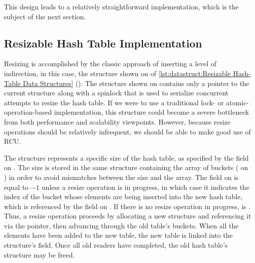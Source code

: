 This design leads to a relatively straightforward implementation,
which is the subject of the next section.

\subsection{Resizable Hash Table Implementation}
\label{sec:datastruct:Resizable Hash Table Implementation}

\begin{fcvref}
Resizing is accomplished by the classic approach of inserting a level
of indirection, in this case, the  structure shown on
 of
\cref{lst:datastruct:Resizable Hash-Table Data Structures}
().
The  structure shown on
 contains only a
pointer to the current  structure along with a spinlock that
is used to serialize concurrent attempts to resize the hash table.
If we were to use a traditional lock- or atomic-operation-based
implementation, this  structure could become a severe bottleneck
from both performance and scalability viewpoints.
However, because resize operations should be relatively infrequent,
we should be able to make good use of RCU\@.

\begin{listing}

\caption{Resizable Hash-Table Data Structures}
\label{lst:datastruct:Resizable Hash-Table Data Structures}
\end{listing}

The  structure represents a specific size of the hash table,
as specified by the  field on .
The size is stored in the same structure containing the array of
buckets ( on
) in order to avoid mismatches between
the size and the array.
The  field on
 is equal to $-1$ unless a resize
operation
is in progress, in which case it indicates the index of the bucket whose
elements are being inserted into the new hash table, which is referenced
by the  field on .
If there is no resize operation in progress,  is .
Thus, a resize operation proceeds by allocating a new  structure
and referencing it via the  pointer, then advancing
 through the old table's buckets.
When all the elements have been added to the new table, the new
table is linked into the  structure's  field.
Once all old readers have completed, the old hash table's  structure
may be freed.


\end{fcvref}
